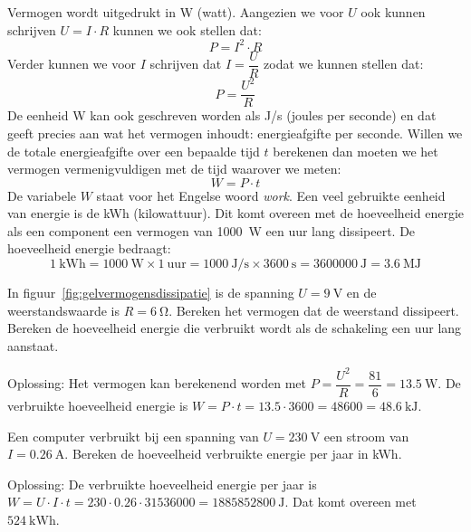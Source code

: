 Vermogen wordt uitgedrukt in \si{\watt} (watt). Aangezien we voor $U$ ook kunnen schrijven $U=I\cdot R$
kunnen we ook stellen dat:
\begin{equation}
P = I^2\cdot R
\end{equation}
Verder kunnen we voor $I$ schrijven dat $I=\dfrac{U}{R}$ zodat we kunnen stellen dat:
\begin{equation}
P = \dfrac{U^2}{R}
\end{equation}
%
De eenheid \si{\watt} kan ook geschreven worden als \si[per-mode=symbol]{\joule\per\second} (joules per
seconde) en dat geeft precies aan wat het vermogen inhoudt: energieafgifte per seconde. Willen
we de totale energieafgifte over een bepaalde tijd $t$ berekenen dan moeten we het vermogen
vermenigvuldigen met de tijd waarover we meten:
%
\begin{equation}
W = P\cdot t
\end{equation}
%
De variabele $W$ staat voor het Engelse woord \textsl{work}. Een veel gebruikte eenheid van energie
is de \si{\kWh} (kilowattuur). Dit komt overeen met de hoeveelheid energie als een component een vermogen van
\SI{1000}{\watt} een uur lang dissipeert. De hoeveelheid energie bedraagt:
%
\begin{equation}
\SI{1}{\kWh} = \SI{1000}{\watt}  \times 1\ \mathrm{uur} = \SI{1000}{\joule\per\second} \times \SI{3600}{\second} = \SI{3600000}{\joule} = \SI{3.6}{\mega\joule}
\end{equation}
%
\begin{example}
In figuur~\ref{fig:gelvermogensdissipatie} is de spanning $U=\SI{9}{\volt}$ en de weerstandswaarde is
$R=\SI{6}{\ohm}$. Bereken het vermogen dat de weerstand dissipeert. Bereken de hoeveelheid energie die
verbruikt wordt als de schakeling een uur lang aanstaat.

Oplossing: Het vermogen kan berekenend worden met $P = \dfrac{U^2}{R} = \dfrac{81}{6} = \SI{13.5}{\watt}$.
De\\[1ex] verbruikte hoeveelheid energie is $W=P\cdot t = \num{13.5}\cdot\num{3600} = \num{48600} = \SI{48.6}{\kilo\joule}$.

Een computer verbruikt bij een spanning van $U=\SI{230}{\volt}$ een stroom van $I=\SI{0.26}{\ampere}$.
Bereken de hoeveelheid verbruikte energie per jaar in \si{\kWh}.

Oplossing: De verbruikte hoeveelheid energie per jaar is $W=U\cdot I\cdot t = \num{230}\cdot\num{0.26}\cdot\num{31536000}=\SI{1885852800}{\joule}$. Dat komt overeen met $\SI{524}{\kWh}$.
\end{example}


